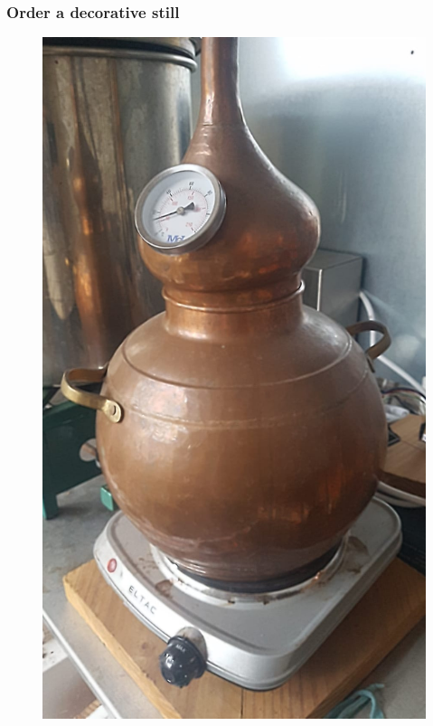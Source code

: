\documentclass{beamer}
\begin{document}
\begin{frame}
\frametitle{Order a decorative still}
\begin{figure}
\includegraphics[height=.7\textheight]{images/decorative-still.jpeg}
\end{figure}
\end{frame}
\end{document}
